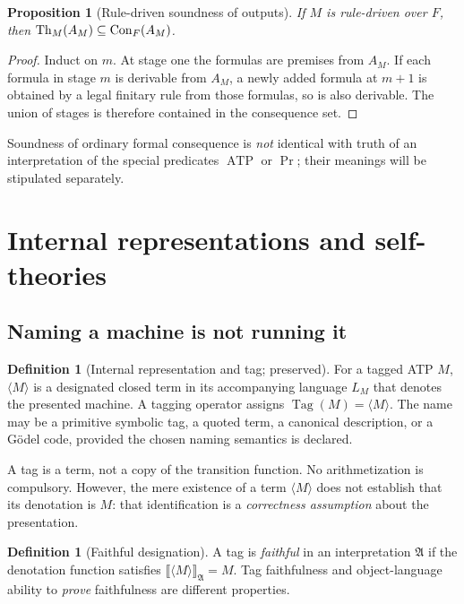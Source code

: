 \documentclass[11pt,letterpaper]{article}
\newtheorem{proposition}[theorem]{Proposition}
\theoremstyle{definition}\newtheorem{definition}[theorem]{Definition}\newtheorem{example}[theorem]{Example}\newtheorem{protocol}[theorem]{Protocol}\newtheorem{question}[theorem]{Open Problem}
\theoremstyle{remark}\newtheorem{remark}[theorem]{Remark}
\newcommand{\Th}{\operatorname{Th}}
\newcommand{\Tag}{\operatorname{Tag}}
\newcommand{\Prov}{\operatorname{Pr}}
\newcommand{\Mtag}{\langle M\rangle}
\begin{document}
\begin{proposition}[Rule-driven soundness of outputs]\label{prop:sound}
If $M$ is rule-driven over $F$, then $\Th_M(A_M)\subseteq\Con_F(A_M)$.
\end{proposition}
\begin{proof}
Induct on $m$. At stage one the formulas are premises from $A_M$. If each formula in stage $m$ is derivable from $A_M$, a newly added formula at $m+1$ is obtained by a legal finitary rule from those formulas, so is also derivable. The union of stages is therefore contained in the consequence set.
\end{proof}
Soundness of ordinary formal consequence is \emph{not} identical with truth of an interpretation of the special predicates $\operatorname{ATP}$ or $\Prov$; their meanings will be stipulated separately.

\section{Internal representations and self-theories}
\subsection{Naming a machine is not running it}
\begin{definition}[Internal representation and tag; preserved]
For a tagged ATP $M$, $\Mtag$ is a designated closed term in its accompanying language $L_M$ that denotes the presented machine. A tagging operator assigns $\Tag(M)=\Mtag$. The name may be a primitive symbolic tag, a quoted term, a canonical description, or a G\"odel code, provided the chosen naming semantics is declared.
\end{definition}
A tag is a term, not a copy of the transition function. No arithmetization is compulsory. However, the mere existence of a term $\Mtag$ does not establish that its denotation is $M$: that identification is a \emph{correctness assumption} about the presentation.
\begin{definition}[Faithful designation]
A tag is \emph{faithful} in an interpretation $\mathfrak A$ if the denotation function satisfies $\llbracket\Mtag\rrbracket_{\mathfrak A}=M$. Tag faithfulness and object-language ability to \emph{prove} faithfulness are different properties.
\end{definition}
\end{document}
